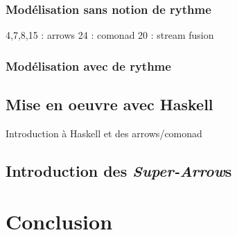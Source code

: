 \documentclass{llncs}
\newcommand{\SAs}{\emph{Super-Arrow}s }
\begin{document}
\subsubsection{Modélisation sans notion de rythme}
4,7,8,15 : arrows
24 : comonad
20 : stream fusion

\subsubsection{Modélisation avec de rythme}
\subsection{Mise en oeuvre avec Haskell}
Introduction à Haskell et des arrows/comonad
\subsection{Introduction des \SAs}

\section{Conclusion}





\end{document}
